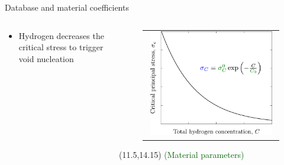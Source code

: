 \documentclass[9pt]{beamer}
\begin{document}
\begin{frame}{Database and material coefficients}
\begin{columns}
\begin{column}{0.6\textwidth}
\begin{itemize}
		\vspace{0.15cm}

		\item Hydrogen decreases the critical stress to trigger void nucleation
        
	\end{itemize}

	\end{column}
    
    \begin{column}{0.4\textwidth}

	\begin{figure}
		\begin{tabular}{c}
			\includegraphics[width=0.95\textwidth]{Images/plot_sig_c.pdf}
		\end{tabular}
	\end{figure}

	\begin{textblock}{5}(11.5,14.15)
		\textcolor{DarkGreen}{\footnotesize (Material parameters)}
	\end{textblock}

	\end{column}
    
\end{columns}

\end{frame}

\end{document}
